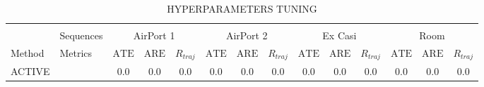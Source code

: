 
\begin{table}[ht]
    \centering
    \caption{\small HYPERPARAMETERS TUNING}
    \vspace{-0.3em}
    
      \begin{adjustbox}{width=\linewidth}
         \setlength{\tabcolsep}{1.5pt}
        \begin{tabular}{l l c c c | c c c | c c c | c c c}
            \toprule\toprule \vspace{-0.8em} \\
            & \multicolumn{1}{l}{Sequences} &
            \multicolumn{3}{c}{AirPort 1} &
            \multicolumn{3}{c}{AirPort 2} &
            \multicolumn{3}{c}{Ex Casi} &
            \multicolumn{3}{c}{Room} \\   
             
            \toprule \multicolumn{1}{l|}{Method} & \multicolumn{1}{l}{Metrics} &
            \multicolumn{1}{c}{$\text{ATE}$} &
            \multicolumn{1}{c}{$\text{ARE}$}  &
            \multicolumn{1}{c}{$R_{traj}$} &
            \multicolumn{1}{c}{$\text{ATE}$} &
            \multicolumn{1}{c}{$\text{ARE}$}  &
            \multicolumn{1}{c}{$R_{traj}$} &
            \multicolumn{1}{c}{$\text{ATE}$} &
            \multicolumn{1}{c}{$\text{ARE}$}  &
            \multicolumn{1}{c}{$R_{traj}$} &
            \multicolumn{1}{c}{$\text{ATE}$} &
            \multicolumn{1}{c}{$\text{ARE}$}  &
            \multicolumn{1}{c}{$R_{traj}$} & \\   


            \multicolumn{1}{l|}{ACTIVE} &&
            \multicolumn{1}{c}{$0.0$} &
            \multicolumn{1}{c}{$0.0$} &
            \multicolumn{1}{c}{$0.0$} &
            \multicolumn{1}{c}{$0.0$} &
            \multicolumn{1}{c}{$0.0$} &
            \multicolumn{1}{c}{$0.0$} &
            \multicolumn{1}{c}{$0.0$} &
            \multicolumn{1}{c}{$0.0$} &
            \multicolumn{1}{c}{$0.0$} &
            \multicolumn{1}{c}{$0.0$} &
            \multicolumn{1}{c}{$0.0$} &
            \multicolumn{1}{c}{$0.0$} & \\   


\end{tabular}
\end{adjustbox}
\end{table}
